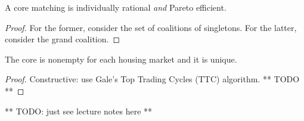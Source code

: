 \begin{prop}
  A core matching is individually rational \textit{and} Pareto efficient. 
\end{prop}

\begin{proof}
  For the former, consider the set of coalitions of singletons. For
  the latter, consider the grand coalition.
\end{proof}

\begin{theorem}
  The core is nonempty for each housing market and it is unique.
\end{theorem}

\begin{proof}
  Constructive: use Gale's Top Trading Cycles (TTC) algorithm. ** TODO **
\end{proof}


** TODO: just see lecture notes here **